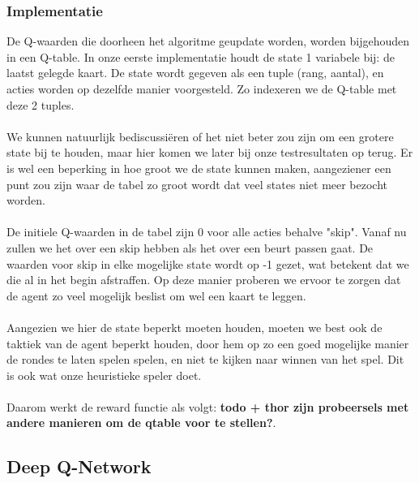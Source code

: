 \documentclass[11pt]{article}
\begin{document}
\subsubsection{Implementatie}
De Q-waarden die doorheen het algoritme geupdate worden, worden bijgehouden in een Q-table. In onze eerste implementatie houdt de state 1 variabele bij: de laatst gelegde kaart. De state wordt gegeven als een tuple (rang, aantal), en acties worden op dezelfde manier voorgesteld. Zo indexeren we de Q-table met deze 2 tuples. \\\\
We kunnen natuurlijk bediscussiëren of het niet beter zou zijn om een grotere state bij te houden, maar hier komen we later bij onze testresultaten op terug. Er is wel een beperking in hoe groot we de state kunnen maken, aangeziener een punt zou zijn waar de tabel zo groot wordt dat veel states niet meer bezocht worden. \\\\
De initiele Q-waarden in de tabel zijn 0 voor alle acties behalve "skip". Vanaf nu zullen we het over een skip hebben als het over een beurt passen gaat. De waarden voor skip in elke mogelijke state wordt op -1 gezet, wat betekent dat we die al in het begin afstraffen. Op deze manier proberen we ervoor te zorgen dat de agent zo veel mogelijk beslist om wel een kaart te leggen. \\\\
Aangezien we hier de state beperkt moeten houden, moeten we best ook de taktiek van de agent beperkt houden, door hem op zo een goed mogelijke manier de rondes te laten spelen spelen, en niet te kijken naar winnen van het spel. Dit is ook wat onze heuristieke speler doet.\\\\
Daarom werkt de reward functie als volgt: \textbf{todo + thor zijn probeersels met andere manieren om de qtable voor te stellen?}.

\subsection{Deep Q-Network}
\end{document}
